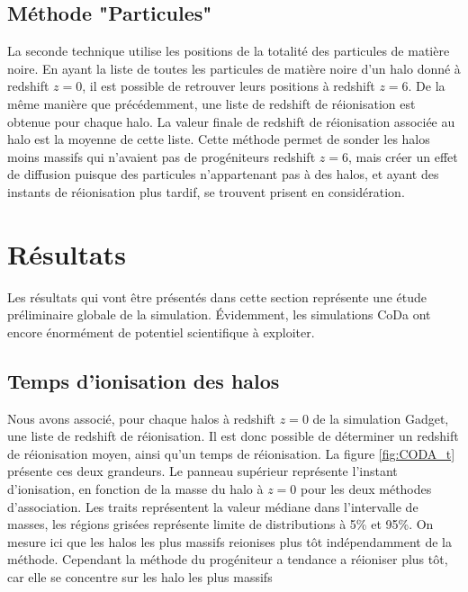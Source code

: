 \subsection{Méthode "Particules"}
La seconde technique utilise les positions de la totalité des particules de matière noire.
En ayant la liste de toutes les particules de matière noire d'un halo donné à redshift $z=0$, il est possible de retrouver leurs positions à redshift $z=6$.
De la même manière que précédemment, une liste de redshift de réionisation est obtenue pour chaque halo.
La valeur finale de redshift de réionisation associée au halo est la moyenne de cette liste.
Cette méthode permet de sonder les halos moins massifs qui n'avaient pas de progéniteurs redshift $z=6$, mais créer un effet de diffusion puisque des particules n'appartenant pas à des halos, et ayant des instants de réionisation plus tardif, se trouvent prisent en considération.

\section{Résultats}

Les résultats qui vont être présentés dans cette section représente une étude préliminaire globale de la simulation.
Évidemment, les simulations \ac{CoDa} ont encore énormément de potentiel scientifique à exploiter.

\subsection{Temps d'ionisation des halos}

Nous avons associé, pour chaque halos à redshift $z=0$ de la simulation Gadget, une liste de redshift de réionisation.
Il est donc possible de déterminer un redshift de réionisation moyen, ainsi qu'un temps de réionisation.
La figure \ref{fig:CODA_t} présente ces deux grandeurs.
Le panneau supérieur représente l'instant d'ionisation, en fonction de la masse du halo à $z=0$ pour les deux méthodes d'association.
Les traits représentent la valeur médiane dans l'intervalle de masses, les régions grisées représente limite de distributions à 5\% et 95\%.
On mesure ici que les halos les plus massifs reionises plus tôt indépendamment de la méthode.
Cependant la méthode du progéniteur a tendance a réioniser plus tôt, car elle se concentre sur les halo les plus massifs

